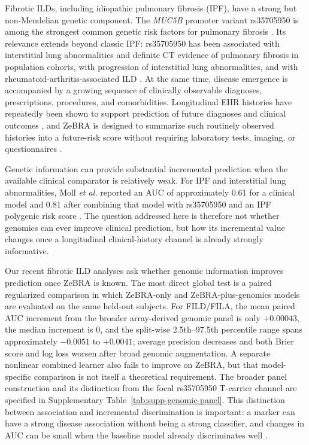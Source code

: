 Fibrotic ILDs, including idiopathic pulmonary fibrosis (IPF), have a strong but non-Mendelian genetic component. The \textit{MUC5B} promoter variant rs35705950 is among the strongest common genetic risk factors for pulmonary fibrosis \cite{Seibold2011,Fingerlin2013,Allen2020}. Its relevance extends beyond classic IPF: rs35705950 has been associated with interstitial lung abnormalities and definite CT evidence of pulmonary fibrosis in population cohorts, with progression of interstitial lung abnormalities, and with rheumatoid-arthritis-associated ILD \cite{Hunninghake2013,Araki2016,Juge2018}. At the same time, disease emergence is accompanied by a growing sequence of clinically observable diagnoses, prescriptions, procedures, and comorbidities. Longitudinal EHR histories have repeatedly been shown to support prediction of future diagnoses and clinical outcomes \cite{Miotto2016,Rajkomar2018}, and ZeBRA is designed to summarize such routinely observed histories into a future-risk score without requiring laboratory tests, imaging, or questionnaires \cite{Onishchenko2026}.

Genetic information can provide substantial incremental prediction when the available clinical comparator is relatively weak. For IPF and interstitial lung abnormalities, Moll \emph{et al.} reported an AUC of approximately 0.61 for a clinical model and 0.81 after combining that model with rs35705950 and an IPF polygenic risk score \cite{Moll2023}. The question addressed here is therefore not whether genomics can ever improve clinical prediction, but how its incremental value changes once a longitudinal clinical-history channel is already strongly informative.

Our recent fibrotic ILD analyses ask whether genomic information improves prediction once ZeBRA is known. The most direct global test is a paired regularized comparison in which ZeBRA-only and ZeBRA-plus-genomics models are evaluated on the same held-out subjects. For FILD/FILA, the mean paired AUC increment from the broader array-derived genomic panel is only $+0.00043$, the median increment is 0, and the split-wise 2.5th--97.5th percentile range spans approximately $-0.0051$ to $+0.0041$; average precision decreases and both Brier score and log loss worsen after broad genomic augmentation. A separate nonlinear combined learner also fails to improve on ZeBRA, but that model-specific comparison is not itself a theoretical requirement. The broader panel construction and its distinction from the focal rs35705950 T-carrier channel are specified in Supplementary Table~\ref{tab:supp-genomic-panel}. This distinction between association and incremental discrimination is important: a marker can have a strong disease association without being a strong classifier, and changes in AUC can be small when the baseline model already discriminates well \cite{Pepe2004,Pencina2012,Steyerberg2012}.


